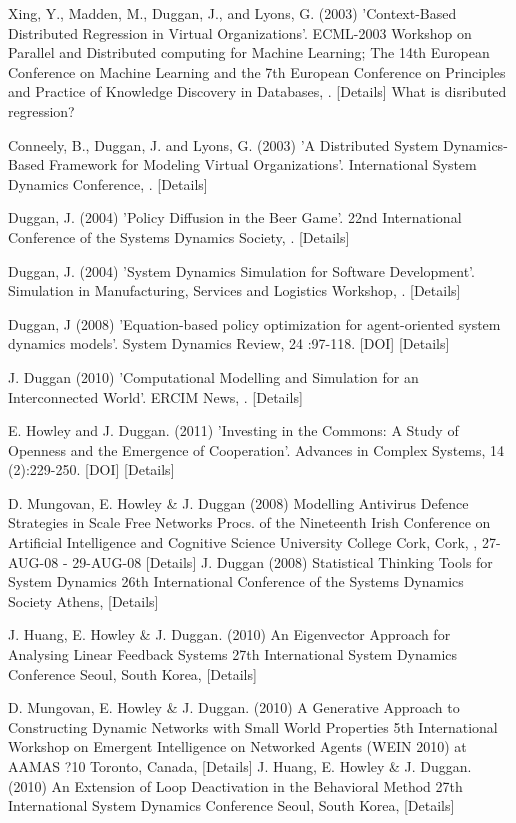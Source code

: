 {Xing, Y., Madden, M., Duggan, J., and Lyons, G. (2003) 'Context-Based Distributed Regression in Virtual Organizations'. ECML-2003 Workshop on Parallel and Distributed computing for Machine Learning; The 14th European Conference on Machine Learning and the 7th European Conference on Principles and Practice of Knowledge Discovery in Databases, . [Details]
What is disributed regression?

Conneely, B., Duggan, J. and Lyons, G. (2003) 'A Distributed System Dynamics-Based Framework for Modeling Virtual Organizations'. International System Dynamics Conference, . [Details]

Duggan, J. (2004) 'Policy Diffusion in the Beer Game'. 22nd International Conference of the Systems Dynamics Society, . [Details]

Duggan, J. (2004) 'System Dynamics Simulation for Software Development'. Simulation in Manufacturing, Services and Logistics Workshop, . [Details]

Duggan, J (2008) 'Equation-based policy optimization for agent-oriented system dynamics models'. System Dynamics Review, 24 :97-118. [DOI] [Details]


J. Duggan (2010) 'Computational Modelling and Simulation for an Interconnected World'. ERCIM News, . [Details]

E. Howley and J. Duggan. (2011) 'Investing in the Commons: A Study of Openness and the Emergence of Cooperation'. Advances in Complex Systems, 14 (2):229-250. [DOI] [Details]

D. Mungovan, E. Howley & J. Duggan (2008) Modelling Antivirus Defence Strategies in Scale Free Networks Procs. of the Nineteenth Irish Conference on Artificial Intelligence and Cognitive Science University College Cork, Cork, , 27-AUG-08 - 29-AUG-08 [Details]
J. Duggan (2008) Statistical Thinking Tools for System Dynamics 26th International Conference of the Systems Dynamics Society Athens, [Details]

J. Huang, E. Howley & J. Duggan. (2010) An Eigenvector Approach for Analysing Linear Feedback Systems 27th International System Dynamics Conference Seoul, South Korea, [Details]

D. Mungovan, E. Howley & J. Duggan. (2010) A Generative Approach to Constructing Dynamic Networks with Small World Properties 5th International Workshop on Emergent Intelligence on Networked Agents (WEIN 2010) at AAMAS ?10 Toronto, Canada, [Details]
J. Huang, E. Howley & J. Duggan. (2010) An Extension of Loop Deactivation in the Behavioral Method 27th International System Dynamics Conference Seoul, South Korea, [Details]

}
